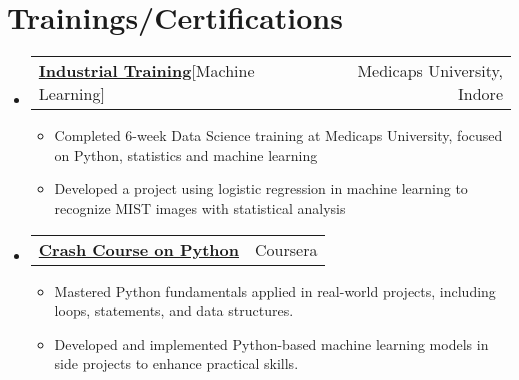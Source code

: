 \documentclass[letterpaper,10pt]{article}
\makeatletter
\newcommand{\resumeItem}[1]{
    \item\small{
      {#1 \vspace{-2pt}}
    }
  }
\newcommand{\resumeCertheading}[2]{
    \vspace{5pt}\item
      \begin{tabular*}{0.97\textwidth}[t]{l@{\extracolsep{\fill}}r}
        {#1} & #2 \\
      \end{tabular*}\vspace{-7pt}
  }
\newcommand{\resumeSubSubheading}[2]{
      \item
      \begin{tabular*}{0.97\textwidth}{l@{\extracolsep{\fill}}r}
        \textit{\small#1} & \textit{\small #2} \\
      \end{tabular*}\vspace{-7pt}
  }
\newcommand{\resumeSubHeadingListStart}{\begin{itemize}[leftmargin=0.15in, label={}]}
\newcommand{\resumeSubHeadingListEnd}{\end{itemize}}
\newcommand{\resumeItemListStart}{\begin{itemize}}
\newcommand{\resumeItemListEnd}{\end{itemize}\vspace{-5pt}}
\makeatother
\begin{document}
\section{Trainings/Certifications}
\resumeSubHeadingListStart

\resumeCertheading
{\textbf{\href{https://medicaps.ac.in/}{Industrial Training}\hspace{5pt}}{{[Machine Learning]}}}{Medicaps University, Indore}
\resumeItemListStart
\resumeItem{Completed 6-week Data Science training at Medicaps University, focused on Python, statistics and machine learning}
\resumeItem{Developed a project using logistic regression in machine learning to recognize MIST images with statistical analysis}
\resumeItemListEnd

\resumeCertheading
{\textbf{\href{https://coursera.org/verify/FHDUZAK7YL3Q}{Crash Course on Python}\hspace{3pt}}{{}}}{Coursera}
\resumeItemListStart
\resumeItem{Mastered Python fundamentals applied in real-world projects, including loops, statements, and data structures.}
\resumeItem{Developed and implemented Python-based machine learning models in side projects to enhance practical skills.}
\resumeItemListEnd
\resumeSubHeadingListEnd
\end{document}
